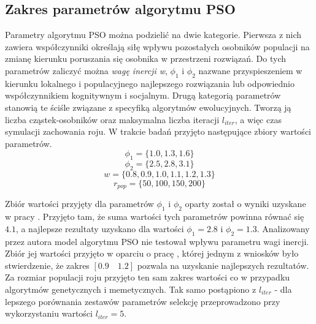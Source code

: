 \subsection{Zakres parametrów algorytmu PSO}
\par
Parametry algorytmu PSO można podzielić na dwie kategorie. Pierwsza z nich zawiera współczynniki określają siłę wpływu pozostałych osobników populacji na zmianę kierunku poruszania się osobnika w przestrzeni rozwiązań. Do tych parametrów zaliczyć można \emph{wagę inercji w}, $\phi_1$ i $\phi_2$ nazwane przyspieszeniem w kierunku lokalnego i populacyjnego najlepszego rozwiązania lub odpowiednio współczynnikiem kognitywnym i socjalnym. Drugą kategorią parametrów stanowią te ściśle związane z specyfiką algorytmów ewolucyjnych. Tworzą ją liczba cząstek-osobników oraz maksymalna liczba iteracji $l_{iter}$, a więc czas symulacji zachowania roju. W trakcie badań przyjęto następujące zbiory wartości parametrów.
\[\phi_1 = \lbrace1.0, 1.3, 1.6 \rbrace\]
\[\phi_2 = \lbrace2.5, 2.8, 3.1\rbrace\]
\[w = \lbrace0.8, 0.9, 1.0, 1.1, 1.2, 1.3\rbrace\]
\[r_{pop} = \lbrace50, 100, 150, 200\rbrace\]

\par
Zbiór wartości przyjęty dla parametrów $\phi_1$ i $\phi_2$ oparty został o wyniki uzyskane w pracy \cite{carlisle2002applying}. Przyjęto tam, że suma wartości tych parametrów powinna równać się $4.1$, a najlepsze rezultaty uzyskano dla wartości $\phi_1=2.8$ i $\phi_2=1.3$. Analizowany przez autora model algorytmu PSO nie testował wpływu parametru wagi inercji. Zbiór jej wartości przyjęto w oparciu o pracę \cite{shi1998modified}, której jednym z wniosków było stwierdzenie, że zakres $[0.9\quad1.2]$ pozwala na uzyskanie najlepszych rezultatów. Za rozmiar populacji roju przyjęto ten sam zakres wartości co w przypadku algorytmów genetycznych i memetycznych. Tak samo postąpiono z $l_{iter}$ - dla lepszego porównania zestawów parametrów selekcję przeprowadzono przy wykorzystaniu wartości $l_{iter}=5$.

